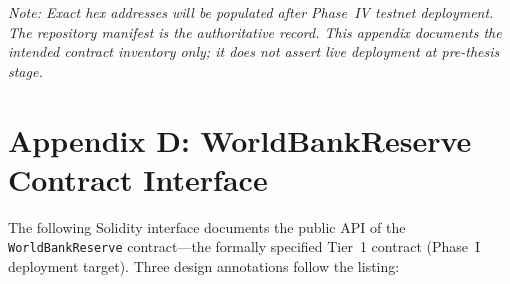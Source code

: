 \documentclass[12pt,a4paper]{report}
\begin{document}
\noindent\textit{Note: Exact hex addresses will be populated after Phase~IV testnet deployment. The repository manifest is the authoritative record. This appendix documents the intended contract inventory only; it does not assert live deployment at pre-thesis stage.}


\chapter*{Appendix D: WorldBankReserve Contract Interface}
{}

The following Solidity interface documents the public API of the \texttt{WorldBankReserve} contract---the formally specified Tier~1 contract (Phase~I deployment target). Three design annotations follow the listing:
\end{document}
